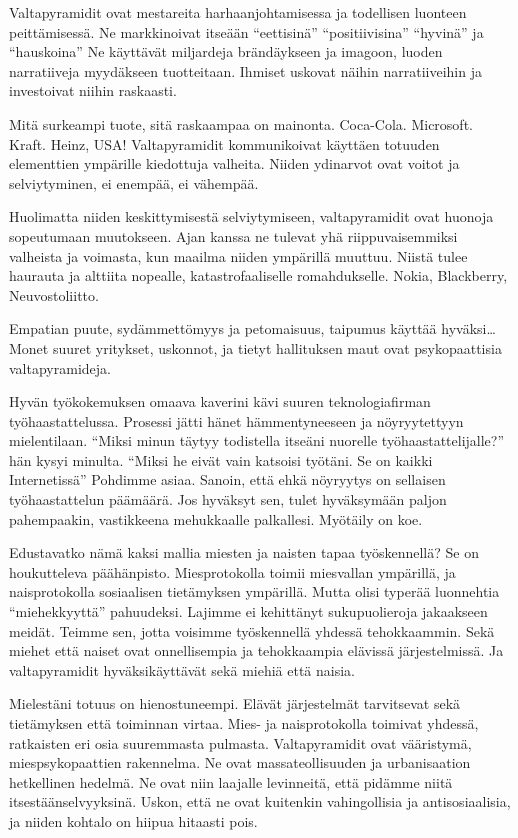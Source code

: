 Valtapyramidit ovat mestareita harhaanjohtamisessa ja todellisen luonteen peittämisessä. Ne markkinoivat itseään ``eettisinä\vmq{,}'' ``positiivisina\vmq{,}'' ``hyvinä'' ja ``hauskoina'' Ne käyttävät miljardeja brändäykseen ja imagoon, luoden narratiiveja myydäkseen tuotteitaan. Ihmiset uskovat näihin narratiiveihin ja investoivat niihin raskaasti.

Mitä surkeampi tuote, sitä raskaampaa on mainonta. Coca-Cola. Microsoft. Kraft. Heinz, USA! Valtapyramidit kommunikoivat käyttäen totuuden elementtien ympärille kiedottuja valheita. Niiden ydinarvot ovat voitot ja selviytyminen, ei enempää, ei vähempää.

Huolimatta niiden keskittymisestä selviytymiseen, valtapyramidit ovat huonoja sopeutumaan muutokseen. Ajan kanssa ne tulevat yhä riippuvaisemmiksi valheista ja voimasta, kun maailma niiden ympärillä muuttuu. Niistä tulee haurauta ja alttiita nopealle, katastrofaaliselle romahdukselle. Nokia, Blackberry, Neuvostoliitto.

Empatian puute, sydämmettömyys ja petomaisuus, taipumus käyttää hyväksi{\ldots} Monet suuret yritykset, uskonnot, ja tietyt hallituksen maut ovat psykopaattisia valtapyramideja.

Hyvän työkokemuksen omaava kaverini kävi suuren teknologiafirman työhaastattelussa. Prosessi jätti hänet hämmentyneeseen ja nöyryytettyyn mielentilaan. ``Miksi minun täytyy todistella itseäni nuorelle työhaastattelijalle?'' hän kysyi minulta. ``Miksi he eivät vain katsoisi työtäni. Se on kaikki Internetissä'' Pohdimme asiaa. Sanoin, että ehkä nöyryytys on sellaisen työhaastattelun päämäärä. Jos hyväksyt sen, tulet hyväksymään paljon pahempaakin, vastikkeena mehukkaalle palkallesi. Myötäily on koe.

Edustavatko nämä kaksi mallia miesten ja naisten tapaa työskennellä? Se on houkutteleva päähänpisto. Miesprotokolla toimii miesvallan ympärillä, ja naisprotokolla sosiaalisen tietämyksen ympärillä. Mutta olisi typerää luonnehtia ``miehekkyyttä'' pahuudeksi. Lajimme ei kehittänyt sukupuolieroja jakaakseen meidät. Teimme sen, jotta voisimme työskennellä yhdessä tehokkaammin. Sekä miehet että naiset ovat onnellisempia ja tehokkaampia elävissä järjestelmissä. Ja valtapyramidit hyväksikäyttävät sekä miehiä että naisia.

Mielestäni totuus on hienostuneempi. Elävät järjestelmät tarvitsevat sekä tietämyksen että toiminnan virtaa. Mies- ja naisprotokolla toimivat yhdessä, ratkaisten eri osia suuremmasta pulmasta. Valtapyramidit ovat vääristymä, miespsykopaattien rakennelma. Ne ovat massateollisuuden ja urbanisaation hetkellinen hedelmä. Ne ovat niin laajalle levinneitä, että pidämme niitä itsestäänselvyyksinä. Uskon, että ne ovat kuitenkin vahingollisia ja antisosiaalisia, ja niiden kohtalo on hiipua hitaasti pois.

